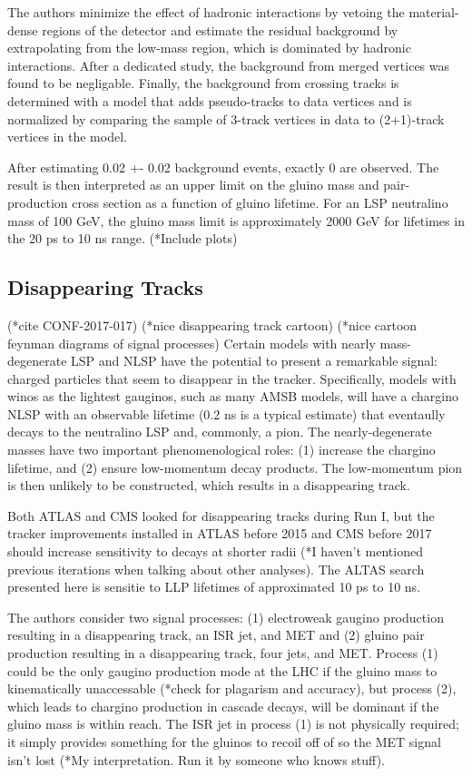 \documentclass[12pt]{article}
\begin{document}
            The authors minimize the effect of hadronic interactions by vetoing the material-dense regions of the detector and estimate the residual background by extrapolating from the low-mass region, which is dominated by hadronic interactions. After a dedicated study, the background from merged vertices was found to be negligable. Finally, the background from crossing tracks is determined with a model that adds pseudo-tracks to data vertices and is normalized by comparing the sample of 3-track vertices in data to (2+1)-track vertices in the model.

            After estimating 0.02 +- 0.02 background events, exactly 0 are observed. The result is then interpreted as an upper limit on the gluino mass and pair-production cross section as a function of gluino lifetime. For an LSP neutralino mass of 100 GeV, the gluino mass limit is approximately 2000 GeV for lifetimes in the 20 ps to 10 ns range. (*Include plots)

\subsection{Disappearing Tracks}
            (*cite CONF-2017-017)
            (*nice disappearing track cartoon)
            (*nice cartoon feynman diagrams of signal processes)
            Certain models with nearly mass-degenerate LSP and NLSP have the potential to present a remarkable signal: charged particles that seem to disappear in the tracker. Specifically, models with winos as the lightest gauginos, such as many AMSB models, will have a chargino NLSP with an observable lifetime (0.2 ns is a typical estimate) that eventaully decays to the neutralino LSP and, commonly, a pion. The nearly-degenerate masses have two important phenomenological roles: (1) increase the chargino lifetime, and (2) ensure low-momentum decay products. The low-momentum pion is then unlikely to be constructed, which results in a disappearing track.

            Both ATLAS and CMS looked for disappearing tracks during Run I, but the tracker improvements installed in ATLAS before 2015 and CMS before 2017 should increase sensitivity to decays at shorter radii (*I haven't mentioned previous iterations when talking about other analyses). The ALTAS search presented here is sensitie to LLP lifetimes of approximated 10 ps to 10 ns.

            The authors consider two signal processes: (1) electroweak gaugino production resulting in a disappearing track, an ISR jet, and MET and (2) gluino pair production resulting in a disappearing track, four jets, and MET. Process (1) could be the only gaugino production mode at the LHC if the gluino mass to kinematically unaccessable (*check for plagarism and accuracy), but process (2), which leads to chargino production in cascade decays, will be dominant if the gluino mass is within reach. The ISR jet in process (1) is not physically required; it simply provides something for the gluinos to recoil off of so the MET signal isn't lost (*My interpretation. Run it by someone who knows stuff).
\end{document}
